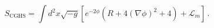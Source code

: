 \begin{equation}
S_{\text{CGHS}} = \int d^2x \sqrt{-g} \left[ e^{-2\phi} (R + 4
(\nabla \phi)^2 + 4)
+ \mathcal{L}_m \right]\, .
\end{equation}

